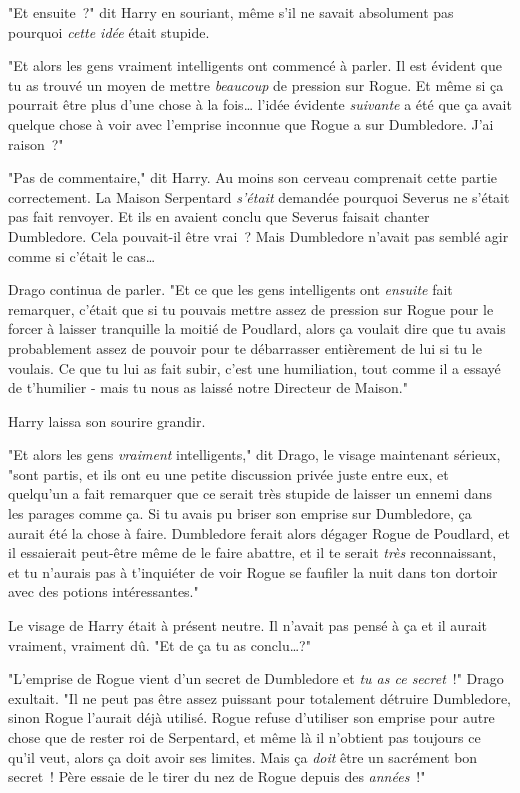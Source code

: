 "Et ensuite~?" dit Harry en souriant, même s'il ne savait absolument pas pourquoi \emph{cette idée} était stupide.

"Et alors les gens vraiment intelligents ont commencé à parler. Il est évident que tu as trouvé un moyen de mettre \emph{beaucoup} de pression sur Rogue. Et même si ça pourrait être plus d'une chose à la fois… l'idée évidente \emph{suivante} a été que ça avait quelque chose à voir avec l'emprise inconnue que Rogue a sur Dumbledore. J'ai raison~?"

"Pas de commentaire," dit Harry. Au moins son cerveau comprenait cette partie correctement. La Maison Serpentard \emph{s'était} demandée pourquoi Severus ne s'était pas fait renvoyer. Et ils en avaient conclu que Severus faisait chanter Dumbledore. Cela pouvait-il être vrai~? Mais Dumbledore n'avait pas semblé agir comme si c'était le cas…

Drago continua de parler. "Et ce que les gens intelligents ont \emph{ensuite} fait remarquer, c'était que si tu pouvais mettre assez de pression sur Rogue pour le forcer à laisser tranquille la moitié de Poudlard, alors ça voulait dire que tu avais probablement assez de pouvoir pour te débarrasser entièrement de lui si tu le voulais. Ce que tu lui as fait subir, c'est une humiliation, tout comme il a essayé de t'humilier - mais tu nous as laissé notre Directeur de Maison."

Harry laissa son sourire grandir.

"Et alors les gens \emph{vraiment} intelligents," dit Drago, le visage maintenant sérieux, "sont partis, et ils ont eu une petite discussion privée juste entre eux, et quelqu'un a fait remarquer que ce serait très stupide de laisser un ennemi dans les parages comme ça. Si tu avais pu briser son emprise sur Dumbledore, ça aurait été la chose à faire. Dumbledore ferait alors dégager Rogue de Poudlard, et il essaierait peut-être même de le faire abattre, et il te serait \emph{très} reconnaissant, et tu n'aurais pas à t'inquiéter de voir Rogue se faufiler la nuit dans ton dortoir avec des potions intéressantes."

Le visage de Harry était à présent neutre. Il n'avait pas pensé à ça et il aurait vraiment, vraiment dû. "Et de ça tu as conclu…?"

"L'emprise de Rogue vient d'un secret de Dumbledore et \emph{tu as ce secret}~!" Drago exultait. "Il ne peut pas être assez puissant pour totalement détruire Dumbledore, sinon Rogue l'aurait déjà utilisé. Rogue refuse d'utiliser son emprise pour autre chose que de rester roi de Serpentard, et même là il n'obtient pas toujours ce qu'il veut, alors ça doit avoir ses limites. Mais ça \emph{doit} être un sacrément bon secret~! Père essaie de le tirer du nez de Rogue depuis des \emph{années}~!"

